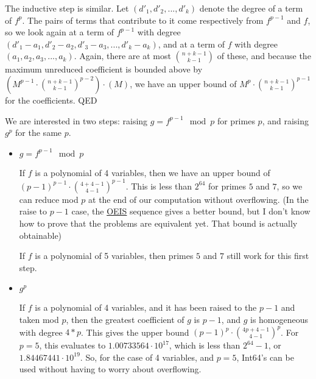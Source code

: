 \documentclass{article}
\begin{document}
The inductive step is similar. Let $(d'_1, d'_2, ... , d'_k)$ denote the degree of a term of $f^p$. The pairs of terms that contribute to it come respectively from $f^{p - 1}$ and $f$, so we look again at a term of $f^{p - 1}$ with degree $(d'_1 - a_1, d'_2 - a_2, d'_3 - a_3, ... , d'_k - a_k)$, and at a term of $f$ with degree $(a_1, a_2, a_3, ... , a_k)$. Again, there are at most $\binom{n + k - 1}{k - 1}$ of these, and because the maximum unreduced coefficient is bounded above by $\left(M^{p - 1} \cdot \binom{n + k - 1}{k - 1} ^ {p - 2}\right) \cdot (M)$, we have an upper bound of $M^p \cdot \binom{n + k - 1}{k - 1}^{p-1}$ for the coefficients. QED

We are interested in two steps: raising $g = f^{p - 1}\mod p$ for primes $p$, and raising $g ^ p$ for the same $p$.

\begin{itemize}
    \item $g = f^{p - 1}\mod p$
    
    If $f$ is a polynomial of 4 variables, then we have an upper bound of $(p - 1)^{p-1} \cdot \binom{4 + 4 - 1}{4 - 1}^{p - 1}$. This is less than $2^{64}$ for primes $5$ and $7$, so we can reduce mod $p$ at the end of our computation without overflowing. (In the raise to $p-1$ case, the \href{https://oeis.org/A333901/internal}{OEIS} sequence gives a better bound, but I don't know how to prove that the problems are equivalent yet. That bound is actually obtainable)

    If $f$ is a polynomial of 5 variables, then primes $5$ and $7$ still work for this first step.

    \item $g ^ p$
    
    If $f$ is a polynomial of 4 variables, and it has been raised to the $p-1$ and taken mod $p$, then the greatest coefficient of $g$ is $p-1$, and $g$ is homogeneous with degree $4 * p$. This gives the upper bound $(p - 1)^{p} \cdot \binom{4p + 4 - 1}{4 - 1}^{p}$. For $p=5$, this evaluates to $1.00733564 \cdot 10^{17}$, which is less than $2^{64} - 1$, or $1.84467441 \cdot 10^{19}$. So, for the case of 4 variables, and $p = 5$, Int64's can be used without having to worry about overflowing.
\end{itemize}
\end{document}
